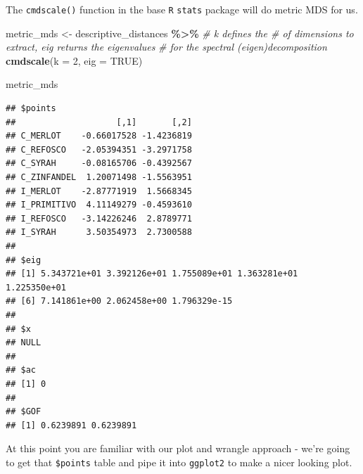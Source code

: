 \documentclass[
]{book}
\newenvironment{Shaded}{\begin{snugshade}}{\end{snugshade}}
\newcommand{\AttributeTok}[1]{\textcolor[rgb]{0.13,0.29,0.53}{#1}}
\newcommand{\CommentTok}[1]{\textcolor[rgb]{0.56,0.35,0.01}{\textit{#1}}}
\newcommand{\ConstantTok}[1]{\textcolor[rgb]{0.56,0.35,0.01}{#1}}
\newcommand{\DecValTok}[1]{\textcolor[rgb]{0.00,0.00,0.81}{#1}}
\newcommand{\FunctionTok}[1]{\textcolor[rgb]{0.13,0.29,0.53}{\textbf{#1}}}
\newcommand{\NormalTok}[1]{#1}
\newcommand{\OtherTok}[1]{\textcolor[rgb]{0.56,0.35,0.01}{#1}}
\newcommand{\SpecialCharTok}[1]{\textcolor[rgb]{0.81,0.36,0.00}{\textbf{#1}}}
\newcommand{\StringTok}[1]{\textcolor[rgb]{0.31,0.60,0.02}{#1}}
\begin{document}
The \texttt{cmdscale()} function in the base \texttt{R} \texttt{stats} package will do metric MDS for us.

\begin{Shaded}
\begin{Highlighting}[]
\NormalTok{metric\_mds }\OtherTok{\textless{}{-}} 
\NormalTok{  descriptive\_distances }\SpecialCharTok{\%\textgreater{}\%}
  \CommentTok{\# \textasciigrave{}k\textasciigrave{} defines the \# of dimensions to extract, \textasciigrave{}eig\textasciigrave{} returns the eigenvalues}
  \CommentTok{\# for the spectral (eigen)decomposition}
  \FunctionTok{cmdscale}\NormalTok{(}\AttributeTok{k =} \DecValTok{2}\NormalTok{, }\AttributeTok{eig =} \ConstantTok{TRUE}\NormalTok{)}

\NormalTok{metric\_mds}
\end{Highlighting}
\end{Shaded}

\begin{verbatim}
## $points
##                    [,1]       [,2]
## C_MERLOT    -0.66017528 -1.4236819
## C_REFOSCO   -2.05394351 -3.2971758
## C_SYRAH     -0.08165706 -0.4392567
## C_ZINFANDEL  1.20071498 -1.5563951
## I_MERLOT    -2.87771919  1.5668345
## I_PRIMITIVO  4.11149279 -0.4593610
## I_REFOSCO   -3.14226246  2.8789771
## I_SYRAH      3.50354973  2.7300588
## 
## $eig
## [1] 5.343721e+01 3.392126e+01 1.755089e+01 1.363281e+01 1.225350e+01
## [6] 7.141861e+00 2.062458e+00 1.796329e-15
## 
## $x
## NULL
## 
## $ac
## [1] 0
## 
## $GOF
## [1] 0.6239891 0.6239891
\end{verbatim}

At this point you are familiar with our plot and wrangle approach - we're going to get that \texttt{\$points} table and pipe it into \texttt{ggplot2} to make a nicer looking plot.

\begin{Shaded}
\end{Shaded}
\end{document}
